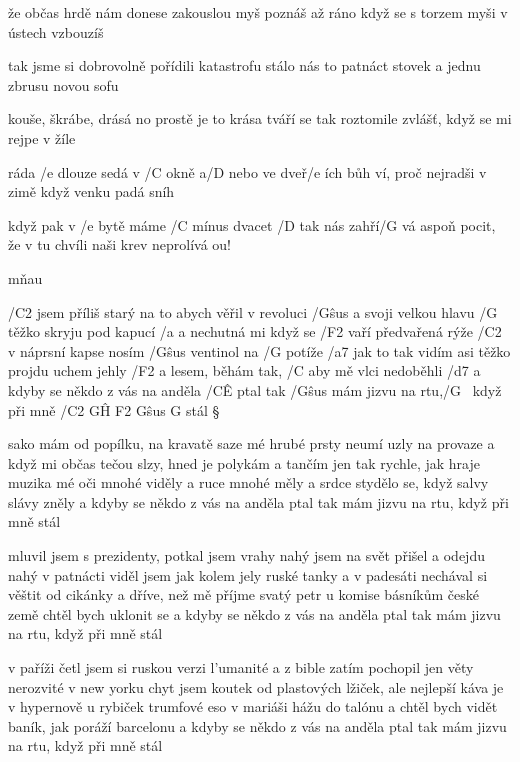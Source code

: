 že občas hrdě nám donese zakouslou myš
poznáš až ráno když se s torzem myši v ústech vzbouzíš \s

tak jsme si dobrovolně pořídili katastrofu
stálo nás to patnáct stovek a jednu zbrusu novou sofu \s \songgg

kouše, škrábe, drásá no prostě je to krása
tváří se tak roztomile zvlášť, když se mi rejpe v žíle

\rr

ráda /e dlouze sedá v /C okně a/D nebo ve dveř/e ích
bůh ví, proč nejradši v zimě když venku padá sníh

když pak v /e bytě máme /C mínus dvacet /D tak nás zahří/G vá
aspoň pocit, že v tu chvíli naši krev neprolívá
ou!

\rr

mňau




/C2 jsem příliš starý na to abych věřil v revoluci
/G\^{sus} a svoji velkou hlavu /G těžko skryju pod kapucí
/a a nechutná mi když se /F2 vaří předvařená rýže
/C2 v náprsní kapse nosím /G\^{sus} ventinol na /G potíže
/a7 jak to tak vidím asi těžko projdu uchem jehly
/F2 a lesem, běhám tak, /C aby mě vlci nedoběhli
/d7 a kdyby se někdo z vás na anděla /C\^E ptal
tak /G\^{sus} mám jizvu na rtu,/G ~když při mně /{C2 G\^H F2 G\^{sus} G} stál \S

sako mám od popílku, na kravatě saze
mé hrubé prsty neumí uzly na provaze
a když mi občas tečou slzy, hned je polykám
a tančím jen tak rychle, jak hraje muzika
mé oči mnohé viděly a ruce mnohé měly
a srdce stydělo se, když salvy slávy zněly
a kdyby se někdo z vás na anděla ptal
tak mám jizvu na rtu, když při mně stál \s

mluvil jsem s prezidenty, potkal jsem vrahy
nahý jsem na svět přišel a odejdu nahý
v patnácti viděl jsem jak kolem jely ruské tanky
a v padesáti nechával si věštit od cikánky
a dříve, než mě příjme svatý petr u komise
básníkům české země chtěl bych uklonit se
a kdyby se někdo z vás na anděla ptal
tak mám jizvu na rtu, když při mně stál \s

v paříži četl jsem si ruskou verzi l'umanité
a z bible zatím pochopil jen věty nerozvité
v new yorku chyt jsem koutek od plastových lžiček, ale
nejlepší káva je v hypernově u rybiček
trumfové eso v mariáši hážu do talónu
a chtěl bych vidět baník, jak poráží barcelonu
a kdyby se někdo z vás na anděla ptal
tak mám jizvu na rtu, když při mně stál \songgg

